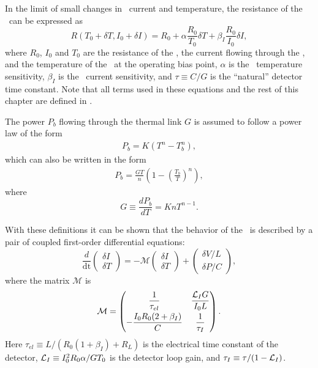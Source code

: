 In the limit of small changes in \TES\ current and temperature, the resistance of the \TES\ can be expressed as
\begin{equation}
R(T_0+\delta T,I_0+\delta I) = R_0 + \alpha \frac{R_0}{T_0} \delta T + %
									 \beta_I \frac{R_0}{I_0} \delta I,
\end{equation}
where $R_0$, $I_0$ and $T_0$ are the resistance of the \TES, the current flowing through the \TES, and the temperature of the \TES\ at the operating bias point, $\alpha$ is the \TES\ temperature sensitivity, $\beta_I$ is the \TES\ current sensitivity, and $\tau \equiv C / G$ is the ``natural'' detector time constant.
Note that all terms used in these equations and the rest of this chapter are defined in .

The power $P_b$ flowing through the thermal link $G$ is assumed to follow a power law of the form
\begin{eqnarray} \label{eqn:ch3-p-bath}
P_{b} = K(T^n - T^n_{b}),
\end{eqnarray}
which can also be written in the form
\begin{eqnarray}
P_{b} = \frac{GT}{n}\left(1 - \left(\frac{T_{b}}{T}\right)^n\right),
\end{eqnarray}
where
\begin{equation}
G \equiv \frac{d P_{b}}{dT} = K n T^{n-1}.
\end{equation}

With these definitions it can be shown \cite{irwin_transition-edge_2005} that the behavior of the \TES\ is described by a pair of coupled first-order differential equations:
\begin{equation}
\frac{d}{\mathop{dt}} \begin{pmatrix} \delta I \\ \delta T \end{pmatrix}
	= - \mathcal{M} \begin{pmatrix}	\delta I \\	\delta T \end{pmatrix}
      + \begin{pmatrix} \delta V / L \\ \delta P /C \end{pmatrix},
\end{equation}
where the matrix $\mathcal{M}$ is
\begin{equation}
\mathcal{M} = \begin{pmatrix}
		\dfrac{1}{\tau_{el}} & \dfrac{\mathcal{L}_I G}{I_0 L} \\[0.75em] 
		-\dfrac{I_0 R_0(2 + \beta_I)}{C} & \dfrac{1}{\tau_I}
    \end{pmatrix}.
\end{equation}
Here $\tau_{el} \equiv L / (R_0(1+\beta_I) + R_L)$ is the electrical time constant of the detector, $\mathcal{L}_I \equiv I_0^2 R_0 \alpha / G T_0$ is the detector loop gain, and $\tau_I \equiv \tau / (1 - \mathcal{L}_I)$.

